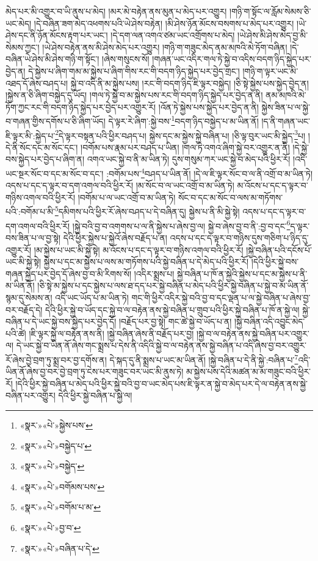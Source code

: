 མེད་པར་མི་འགྱུར་བ་ཡི་ནུས་པ་མེད། །མར་མེ་བརྟེན་ནས་མུན་པ་མེད་པར་འགྱུར། །གཉི་ག་སྟོང་ལ་རློམ་སེམས་ཅི་ཡང་མེད། །དེ་བཞིན་ཟག་མེད་འཕགས་པའི་ཡེ་ཤེས་བརྟེན། །མི་ཤེས་ཉོན་མོངས་བསགས་པ་མེད་པར་འགྱུར། །ཡེ་ཤེས་དང་ནི་ཉོན་མོངས་རྟག་པར་ཡང་། །དེ་དག་ལན་འགའ་ཙམ་ཡང་འགྲོགས་པ་མེད། །ཡེ་ཤེས་མི་ཤེས་མེད་བྱ་མི་སེམས་ཀྱང་། །ཡེ་ཤེས་བརྟེན་ནས་མི་ཤེས་མེད་པར་འགྱུར། །གཉི་ག་གཟུང་མེད་ནམ་མཁའི་མེ་ཏོག་བཞིན། །དེ་བཞིན་ཡེ་ཤེས་མི་ཤེས་གཉི་ག་སྟོང་། །ཞེས་གསུངས་སོ། །གཞན་ཡང་འདིར་གལ་ཏེ་སྐྱེ་བ་འདིས་བདག་ཉིད་སྐྱེད་པར་བྱེད་ན། དེ་སྐྱེས་པ་ཞིག་གམ་མ་སྐྱེས་པ་ཞིག་གིས་རང་གི་བདག་ཉིད་སྐྱེད་པར་བྱེད་གྲང་། །གཉི་ག་ལྟར་ཡང་མི་འཐད་དོ་ཞེས་བཤད་པ། སྐྱེ་བ་འདི་ནི་མ་སྐྱེས་པས། །རང་གི་བདག་ཉིད་ཇི་ལྟར་བསྐྱེད། །ཅི་སྟེ་སྐྱེས་པས་སྐྱེད་བྱེད་ན། །སྐྱེས་ན་ཅི་ཞིག་བསྐྱེད་དུ་ཡོད། །གལ་ཏེ་སྐྱེ་བ་མ་སྐྱེས་པས་རང་གི་བདག་ཉིད་སྐྱེད་པར་བྱེད་ན་ནི། ནམ་མཁའི་མེ་ཏོག་ཀྱང་རང་གི་བདག་ཉིད་སྐྱེད་པར་བྱེད་པར་འགྱུར་རོ། །འོན་ཏེ་སྐྱེས་པས་སྐྱེད་པར་བྱེད་ན་ནི། སྐྱེས་ཟིན་པ་ལ་སྐྱེ་བ་གཞན་གྱིས་དགོས་པ་ཅི་ཞིག་ཡོད། དེ་ལྟར་རེ་ཞིག་:སྐྱེ་བས་\footnote{«སྣར་»«པེ་»སྐྱེས་པས་}བདག་ཉིད་བསྐྱེད་པ་མ་ཡིན་ནོ། །ད་ནི་གཞན་ཡང་ཇི་ལྟར་མི་:སྐྱེད་པ་\footnote{«སྣར་»«པེ་»བསྐྱེད་པ་}དེ་ལྟར་བསྟན་པའི་ཕྱིར་བཤད་པ། སྐྱེས་དང་མ་སྐྱེས་སྐྱེ་བཞིན་པ། །ཅི་ལྟ་བུར་ཡང་མི་སྐྱེད་\footnote{«སྣར་»«པེ་»བསྐྱེད་}པ། །དེ་ནི་སོང་དང་མ་སོང་དང་། །བགོམ་པས་རྣམ་པར་བཤད་པ་ཡིན། །གལ་ཏེ་འགའ་ཞིག་སྐྱེ་བར་འགྱུར་ན་ནི། །དེ་སྐྱེ་བས་སྐྱེད་པར་བྱེད་པ་ཞིག་ན། འགའ་ཡང་སྐྱེ་བ་ནི་མ་ཡིན་ཏེ། དུས་གསུམ་ཀར་ཡང་སྐྱེ་བ་མེད་པའི་ཕྱིར་རོ། །འདི་ཡང་སྔར་སོང་བ་དང་མ་སོང་བ་དང་། :བགོམ་པས་\footnote{«སྣར་»«པེ་»བགོམས་པས་}བཤད་པ་ཡིན་ནོ། །དེ་ལ་ཇི་ལྟར་སོང་བ་ལ་ནི་འགྲོ་བ་མ་ཡིན་ཏེ། འདས་པ་དང་ད་ལྟར་བ་དག་འགལ་བའི་ཕྱིར་རོ། །མ་སོང་བ་ལ་ཡང་འགྲོ་བ་མ་ཡིན་ཏེ། མ་འོངས་པ་དང་ད་ལྟར་བ་གཉིས་འགལ་བའི་ཕྱིར་རོ། །བགོམ་པ་ལ་ཡང་འགྲོ་བ་མ་ཡིན་ཏེ། སོང་བ་དང་མ་སོང་བ་ལས་མ་གཏོགས་པའི་:བགོམ་པ་མི་\footnote{«སྣར་»«པེ་»བགོམ་པ་མ་}དམིགས་པའི་ཕྱིར་རོ་ཞེས་བཤད་པ་དེ་བཞིན་དུ། སྐྱེས་པ་ནི་མི་སྐྱེ་སྟེ། འདས་པ་དང་ད་ལྟར་བ་དག་འགལ་བའི་ཕྱིར་རོ། །སྐྱེ་བའི་བྱ་བ་འགགས་པ་ལ་ནི་སྐྱེས་པ་ཞེས་བྱ་ལ། སྐྱེ་བ་ཞེས་བྱ་བ་ནི་:བྱ་བ་དང་\footnote{«སྣར་»«པེ་»བྱ་བ་}ད་ལྟར་བས་ཟིན་པ་ལ་བྱ་སྟེ། དེའི་ཕྱིར་སྐྱེས་པ་སྐྱེའོ་ཞེས་བརྗོད་པ་ན། འདས་པ་དང་ད་ལྟར་བ་གཉིས་དུས་གཅིག་པ་ཉིད་དུ་འགྱུར་རོ། །མ་སྐྱེས་པ་ཡང་མི་སྐྱེ་སྟེ། མ་འོངས་པ་དང་ད་ལྟར་བ་གཉིས་འགལ་བའི་ཕྱིར་རོ། །སྐྱེ་བཞིན་པའི་དངོས་པོ་ཡང་མི་སྐྱེ་སྟེ། སྐྱེས་པ་དང་མ་སྐྱེས་པ་ལས་མ་གཏོགས་པའི་སྐྱེ་བཞིན་པ་དེ་མེད་པའི་ཕྱིར་རོ། །དེའི་ཕྱིར་སྐྱེ་བས་གཞན་སྐྱེད་པར་བྱེད་དོ་ཞེས་བྱ་བ་མི་རིགས་སོ། །འདིར་སྨྲས་པ། སྐྱེ་བཞིན་པ་ཁོ་ན་སྐྱེའི་སྐྱེས་པ་དང་མ་སྐྱེས་པ་ནི་མ་ཡིན་ནོ། །ཅི་སྟེ་མ་སྐྱེས་པ་དང་སྐྱེས་པ་ལས་ཐ་དད་པར་སྐྱེ་བཞིན་པ་མེད་པའི་ཕྱིར་སྐྱེ་བཞིན་པ་སྐྱེ་བ་མ་ཡིན་ནོ་སྙམ་དུ་སེམས་ན། འདི་ཡང་ཡོད་པ་མ་ཡིན་ཏེ། གང་གི་ཕྱིར་འདིར་སྐྱེ་བའི་བྱ་བ་དང་ལྡན་པ་ལ་སྐྱེ་བཞིན་པ་ཞེས་བྱ་བར་བརྗོད་དེ། དེའི་ཕྱིར་སྐྱེ་བ་ཡོད་དང་སྐྱེ་བ་ལ་བརྟེན་ནས་སྐྱེ་བཞིན་པ་གྲུབ་པའི་ཕྱིར་སྐྱེ་བཞིན་པ་ཁོ་ན་སྐྱེ་ལ། སྐྱེ་བཞིན་པ་དེ་ཡང་སྐྱེ་བས་སྐྱེད་པར་བྱེད་དོ། །བརྗོད་པར་བྱ་སྟེ། གང་ཚེ་སྐྱེ་བ་ཡོད་པ་ན། །སྐྱེ་བཞིན་འདི་འབྱུང་མེད་པའི་ཚེ། །ཇི་ལྟར་སྐྱེ་ལ་བརྟེན་ནས་ནི། །སྐྱེ་བཞིན་ཞེས་ནི་བརྗོད་པར་བྱ། །སྐྱེ་བ་ལ་བརྟེན་ནས་སྐྱེ་བཞིན་པར་འགྱུར་ལ། དེ་ཡང་སྐྱེ་བ་ཡིན་ནོ་ཞེས་གང་སྨྲས་པ་དེས་ནི་འདིའི་སྐྱེ་བ་ལ་བརྟེན་ནས་སྐྱེ་བཞིན་པ་འདི་ཞེས་བྱ་བར་འགྱུར་རོ་ཞེས་བྱེ་བྲག་ཏུ་སྨྲ་བར་བྱ་དགོས་ན། དེ་སྐད་དུ་ནི་སྨྲས་པ་ཡང་མ་ཡིན་ནོ། །སྐྱེ་བཞིན་པ་དེ་ནི་སྐྱེ་:བཞིན་པ་\footnote{«སྣར་»«པེ་»བཞིན་པ་དེ་}འདི་ཡིན་ནོ་ཞེས་བྱ་བར་བྱེ་བྲག་ཏུ་ངེས་པར་གཟུང་བར་ཡང་མི་ནུས་ཏེ། མ་སྐྱེས་པས་དེའི་མཚན་མ་མ་གཟུང་བའི་ཕྱིར་རོ། །དེའི་ཕྱིར་སྐྱེ་བཞིན་པ་མེད་པའི་ཕྱིར་སྐྱེ་བའི་བྱ་བ་ཡང་མེད་པས་ཇི་ལྟར་ན་སྐྱེ་བ་མེད་པར་དེ་ལ་བརྟེན་ནས་སྐྱེ་བཞིན་པར་འགྱུར། དེའི་ཕྱིར་སྐྱེ་བཞིན་པ་སྐྱེ་ལ། 